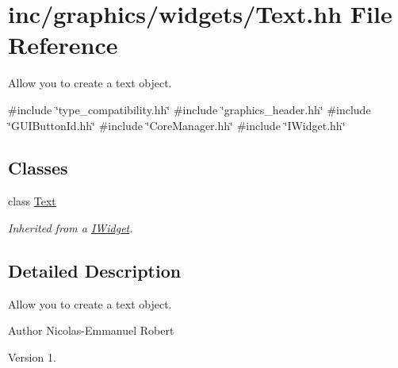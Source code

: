 \hypertarget{Text_8hh}{}\section{inc/graphics/widgets/\+Text.hh File Reference}
\label{Text_8hh}


Allow you to create a text object.  


{\ttfamily \#include \char`\"{}type\+\_\+compatibility.\+hh\char`\"{}}\newline
{\ttfamily \#include \char`\"{}graphics\+\_\+header.\+hh\char`\"{}}\newline
{\ttfamily \#include \char`\"{}G\+U\+I\+Button\+Id.\+hh\char`\"{}}\newline
{\ttfamily \#include \char`\"{}Core\+Manager.\+hh\char`\"{}}\newline
{\ttfamily \#include \char`\"{}I\+Widget.\+hh\char`\"{}}\newline
\subsection*{Classes}
\begin{DoxyCompactItemize}
\item 
class \hyperlink{classText}{Text}
\begin{DoxyCompactList}\small\item\em Inherited from a \hyperlink{classIWidget}{I\+Widget}. \end{DoxyCompactList}\end{DoxyCompactItemize}


\subsection{Detailed Description}
Allow you to create a text object. 

\begin{DoxyAuthor}{Author}
Nicolas-\/\+Emmanuel Robert 
\end{DoxyAuthor}
\begin{DoxyVersion}{Version}
1. 
\end{DoxyVersion}
